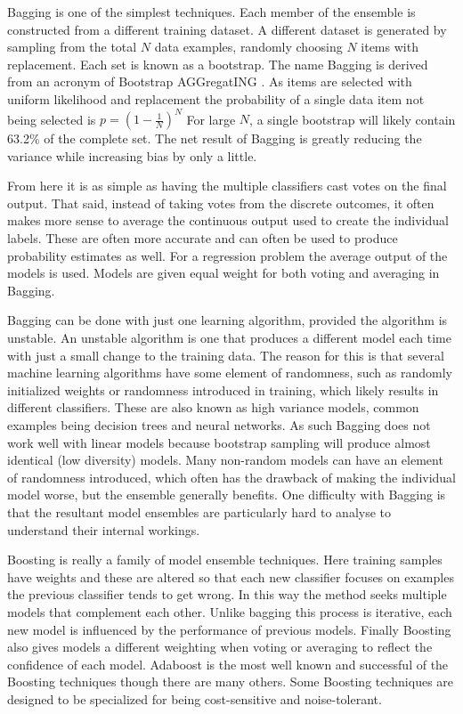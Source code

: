 Bagging is one of the simplest techniques.
Each member of the ensemble is constructed from a different training dataset.
A different dataset is generated by sampling from the total $N$ data examples, randomly choosing $N$ items with replacement.
Each set is known as a bootstrap.
The name Bagging is derived from an acronym of Bootstrap AGGregatING \citep{hothorn2003double}. 
As items are selected with uniform likelihood and replacement the probability of a single data item not being selected is $p = (1−\frac{1}{N})^N$ 
For large $N$, a single bootstrap will likely contain 63.2\% of the complete set.
The net result of Bagging is greatly reducing the variance while increasing bias by only a little.

From here it is as simple as having the multiple classifiers cast votes on the final output.
That said, instead of taking votes from the discrete outcomes, it often makes more sense to average the continuous output used to create the individual labels.
These are often more accurate and can often be used to produce probability estimates as well.
For a regression problem the average output of the models is used.
Models are given equal weight for both voting and averaging in Bagging\citep{witten2005data}.

Bagging can be done with just one learning algorithm, provided the algorithm is unstable.
An unstable algorithm is one that produces a different model each time with just a small change to the training data.
The reason for this is that several machine learning algorithms have some element of randomness, such as randomly initialized weights or randomness introduced in training, which likely results in different classifiers.
These are also known as high variance models, common examples being decision trees and neural networks.
As such Bagging does not work well with linear models because bootstrap sampling will produce almost identical (low diversity) models.
Many non-random models can have an element of randomness introduced, which often has the drawback of making the individual model worse, but the ensemble generally benefits.
One difficulty with Bagging is that the resultant model ensembles are particularly hard to analyse to understand their internal workings.


Boosting is really a family of model ensemble techniques.
Here training samples have weights and these are altered so that each new classifier focuses on examples the previous classifier tends to get wrong\citep{witten2005data}.
In this way the method seeks multiple models that complement each other.
Unlike bagging this process is iterative, each new model is influenced by the performance of previous models\citep{witten2005data}.
Finally Boosting also gives models a different weighting when voting or averaging to reflect the confidence of each model.
Adaboost is the most well known and successful of the Boosting techniques though there are many others.
Some Boosting techniques are designed to be specialized for being cost-sensitive and noise-tolerant.
